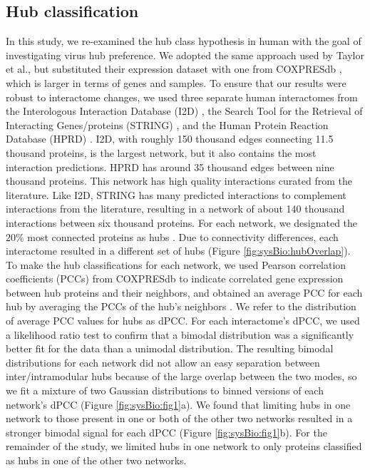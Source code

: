 \subsection{Hub classification}

In this study, we re-examined the hub class hypothesis in human with
the goal of investigating virus hub preference. We adopted the same
approach used by Taylor et al., but substituted their expression
dataset with one from COXPRESdb \cite{obayashi07}, which is larger in
terms of genes and samples. To ensure that our results were robust to
interactome changes, we used three separate human interactomes from
the Interologous Interaction Database (I2D) \cite{brown05}, the Search
Tool for the Retrieval of Interacting Genes/proteins (STRING)
\cite{von07}, and the Human Protein Reaction Database (HPRD)
\cite{prasad08}. I2D, with roughly 150 thousand edges connecting 11.5
thousand proteins, is the largest network, but it also contains the
most interaction predictions. HPRD has around 35 thousand edges
between nine thousand proteins. This network has high quality
interactions curated from the literature. Like I2D, STRING has many
predicted interactions to complement interactions from the literature,
resulting in a network of about 140 thousand interactions between six
thousand proteins. For each network, we designated the 20\% most
connected proteins as hubs \cite{bertin07}. Due to connectivity
differences, each interactome resulted in a different set of hubs
(Figure \ref{fig:sysBio:hubOverlap}). To make the hub classifications
for each network, we used Pearson correlation coefficients (PCCs) from
COXPRESdb to indicate correlated gene expression between hub proteins
and their neighbors, and obtained an average PCC for each hub by
averaging the PCCs of the hub's neighbors \cite{han04,taylor09}. We
refer to the distribution of average PCC values for hubs as dPCC. For
each interactome's dPCC, we used a likelihood ratio test
\cite{ertel08} to confirm that a bimodal distribution was a
significantly better fit for the data than a unimodal
distribution. The resulting bimodal distributions for each network did
not allow an easy separation between inter/intramodular hubs because
of the large overlap between the two modes, so we fit a mixture of two
Gaussian distributions to binned versions of each network's dPCC
(Figure \ref{fig:sysBio:fig1}a). We found that limiting hubs in one
network to those present in one or both of the other two networks
resulted in a stronger bimodal signal for each dPCC (Figure
\ref{fig:sysBio:fig1}b). For the remainder of the study, we limited
hubs in one network to only proteins classified as hubs in one of the
other two networks.

